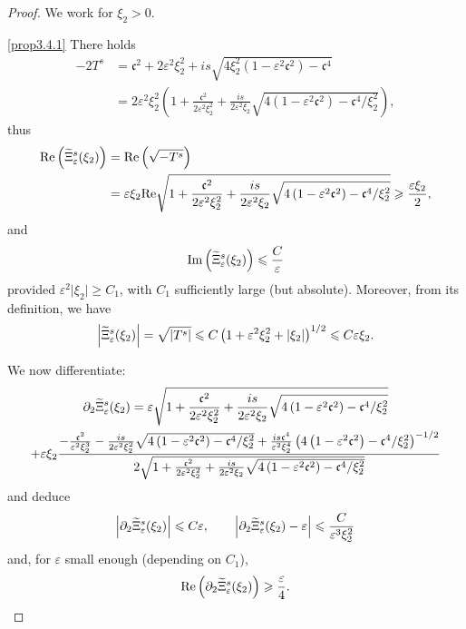 \documentclass[AHL,Unicode,longabstracts,published]{cedram}
\newcommand*\p{\partial}
\newcommand{\Imm}{\mathrm{Im}}
\newcommand{\Rel}{\mathrm{Re}}
\newcommand*\cs{{\mathfrak c}}
\newcommand*\gs{\geqslant }
\newcommand*\ls{\leqslant }
\newcommand*\e{\varepsilon}
\renewcommand*\t{\tilde}
\let\oldtilde\tilde
\renewcommand*{\tilde}[1]{\mathchoice{\widetilde{#1}}{\widetilde{#1}}{\oldtilde{#1}}{\oldtilde{#1}}}
\begin{document}
\begin{proof}
We work for $ \xi_2 > 0 $.

\noindent\eqref{prop3.4.1}  There holds
\begin{align*}
- 2 T^s & = \cs^2 + 2 \e^2 \xi_2^2 + i s \sqrt{ 4 \xi_2^2 \left(1 - \e^2 \cs^2\right) - \cs^4 }
\\ & = 2 \e^2 \xi_2^2 \left(1 + \frac{\cs^2}{2 \e^2 \xi_2^2} + \frac{i s}{ 2\e^2 \xi_2} \sqrt{ 4 \left(1 - \e^2 \cs^2\right) - \cs^4 /\xi_2^2} \right),
\end{align*}
thus
\begin{align*}
\Rel \left(\t\Xi_\e^s (\xi_2) \right) & = \Rel \left(\sqrt{ - T^s } \right) \\
&= \e \xi_2 \Rel \sqrt{ 1 + \frac{\cs^2}{2 \e^2 \xi_2^2} + \frac{i s}{ 2\e^2 \xi_2} \sqrt{ 4\left(1 - \e^2 \cs^2\right) - \cs^4 /\xi_2^2}}
\gs \frac{\e \xi_2 }{2},
\end{align*}
and
\[
{\Imm} \left(\t\Xi_\e^s (\xi_2) \right) \ls \frac{C}{\e}
\]
provided $ \e^2 \lvert \xi_2 \rvert \gs C_1 $, with $ C_1 $ sufficiently large (but absolute). Moreover, from its definition, we have
\[
\left\lvert \t\Xi_\e^s (\xi_2) \right\rvert = \sqrt{\left\lvert T^s\right\rvert }
\ls C \left(1 + \e^2 \xi_2^2 + \lvert \xi_2 \rvert\right)^{1/2}
\ls C \e \xi_2.
\]

We now differentiate:
\begin{multline*}
\p_2 \t\Xi_\e^s (\xi_2) = \e \sqrt{ 1 + \frac{\cs^2}{2 \e^2 \xi_2^2} + \frac{i s}{ 2\e^2 \xi_2} \sqrt{ 4 \left(1 - \e^2 \cs^2\right) - \cs^4 /\xi_2^2 } }\\
+ \e \xi_2 \frac{ - \frac{\cs^2}{ \e^2 \xi_2^3} - \frac{i s}{ 2 \e^2 \xi_2^2} \sqrt{ 4\left(1 - \e^2 \cs^2\right) - \cs^4 /\xi_2^2 } + \frac{i s \cs^4}{\e^2 \xi_2^4 } \left(4 \left(1 - \e^2 \cs^2\right) - \cs^4 /\xi_2^2\right)^{-1/2}}{2 \sqrt{1 + \frac{\cs^2}{2 \e^2 \xi_2^2} + \frac{i s}{2\e^2 \xi_2} \sqrt{4\left(1 - \e^2 \cs^2\right) - \cs^4 /\xi_2^2}}}
\end{multline*}
and deduce
\[
\left\lvert \p_2 \t\Xi_\e^s (\xi_2) \right\rvert
\ls C \e,
\qquad
\left\lvert \p_2 \t\Xi_\e^s (\xi_2) - \e \right\rvert
\ls \frac{C}{\e^3 \xi_2^2}
\]
and, for $ \e $ small enough (depending on $C_1$),
\begin{align*}
\Rel \left(\p_2 \t\Xi_\e^s (\xi_2) \right)
\gs \frac{\e }{4}.
\end{align*}



\end{proof}
\end{document}
